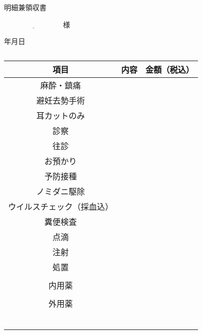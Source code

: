 \documentclass[b6paper]{jsarticle}
\begin{document}
\begin{center}
\Large
明細兼領収書
\end{center}

\large
$\underline{\hspace{100pt}}$様

\begin{flushright}
\normalsize
\vspace{-23pt}
年\hspace{20pt}月\hspace{20pt}日
\end{flushright}
\vspace{-40pt}
\begin{table}[htbp]
	\captionsetup{labelformat=empty,labelsep=none}
	\caption{}
	\label{}
	\begin{center}
	\small
	\begin{tabular}{c|c|c}  \toprule
	項目 & 内容 & 金額（税込）  \\ \hline
	麻酔・鎮痛 & \hspace{100pt} & \\[2pt]
	避妊去勢手術 &  & \\[2pt]
	耳カットのみ &  & \\[2pt]
	診察 &  & \\[2pt]
	往診 &  & \\[2pt]
	お預かり &  & \\[2pt]
	予防接種 &  & \\[2pt]
	ノミダニ駆除 &  & \\[2pt]
	ウイルスチェック（採血込） &  & \\[2pt]
	糞便検査 &  & \\[2pt]
	点滴 &  & \\[2pt]
	注射 &  & \\[2pt]
	処置 &  & \\
	 &  & \\
	内用薬 &  & \\
	 &  & \\
	外用薬 &  & \\
	 &  & \\
	 &  & \\
	 &  & \\
	 &  & \\
	 &  & \\
	 &  & \\  \bottomrule
	 \end{tabular}
	 \end{center}
\end{table}
\small
\end{document}
